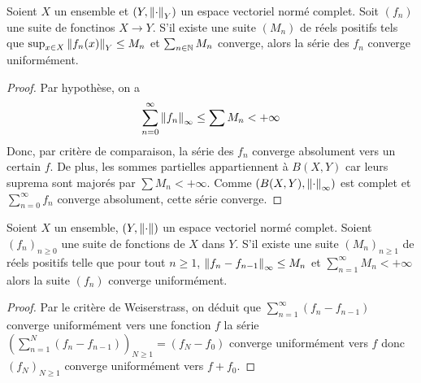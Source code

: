 \begin{proposition}
    Soient $X$ un ensemble et $(Y,\left\| \cdot \right\|_Y)$ un espace vectoriel normé complet. Soit $(f_n)$ une suite de fonctinos $X\to Y$. S'il existe une suite $(M_n)$ de réels positifs tels que $\sup_{x\in X}\left\| f_n(x) \right\|_Y\le M_n$ et $\sum_{n\in\mathbb{N}}M_n$ converge, alors la série des $f_n$ converge uniformément.
\end{proposition}
\begin{proof}
    Par hypothèse, on a $$\sum_{n=0}^\infty \left\| f_n \right\|_\infty\le \sum M_n <+\infty$$
    Donc, par critère de comparaison, la série des $f_n$ converge absolument vers un certain $f$. De plus, les sommes partielles appartiennent à $B(X,Y)$ car leurs suprema sont majorés par $\sum M_n<+\infty$. Comme $(B(X,Y),\left\| \cdot \right\|_\infty)$ est complet et $\sum_{n=0}^\infty f_n$ converge absolument, cette série converge.
\end{proof}
\begin{proposition}
Soient $X$ un ensemble, $(Y,\left\| \cdot \right\|)$ un espace vectoriel normé complet. Soient $(f_n)_{n\ge0}$ une suite de fonctions de $X$ dans $Y$. S'il existe une suite $(M_n)_{n\ge1}$ de réels positifs telle que pour tout $n\ge1$, $\left\| f_n-f_{n-1} \right\|_\infty\le M_n$ et $\sum_{n=1}^\infty M_n<+\infty$ alors la suite $(f_n)$ converge uniformément.
\end{proposition}
\begin{proof}
    Par le critère de Weiserstrass, on déduit que $\sum_{n=1}^\infty (f_n-f_{n-1})$ converge uniformément vers une fonction $f$ \ie la série $\left(\sum_{n=1}^N(f_n-f_{n-
    1})\right)_{N\ge 1} = (f_N-f_0)$ converge uniformément vers $f$ donc $(f_N)_{N\ge1}$ converge uniformément vers $f+f_0$.
\end{proof}
